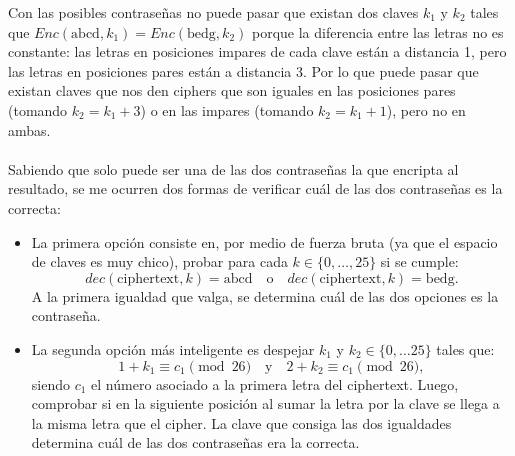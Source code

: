 \documentclass[12pt,addpoints,answers]{exam}
\begin{document}
\begin{questions}
\begin{solution}
    Con las posibles contraseñas no puede pasar que existan dos claves $k_1$ y $k_2$ tales que $Enc(\text{abcd}, k_1) = Enc(\text{bedg}, k_2)$ porque la diferencia entre las letras no es constante: las letras en posiciones impares de cada clave están a distancia 1, pero las letras en posiciones pares están a distancia 3. Por lo que puede pasar que existan claves que nos den ciphers que son iguales en las posiciones pares (tomando $k_2 = k_1 + 3$) o en las impares (tomando $k_2 = k_1 + 1$), pero no en ambas. \\ \\ 
    Sabiendo que solo puede ser una de las dos contraseñas la que encripta al resultado, se me ocurren dos formas de verificar cuál de las dos contraseñas es la correcta:
    \begin{itemize}
        \item La primera opción consiste en, por medio de fuerza bruta (ya que el espacio de claves es muy chico), probar para cada $k \in \{0, \dots , 25\}$ si se cumple:
        \[
            dec(\text{ciphertext}, k) = \text{abcd}
            \quad \text{o} \quad
            dec(\text{ciphertext}, k) = \text{bedg}.
        \]
        A la primera igualdad que valga, se determina cuál de las dos opciones es la contraseña.
        
        \item La segunda opción más inteligente es despejar $k_1$ y $k_2 \in \{ 0, \dots 25 \}$ tales que:
        \[
            1 + k_1 \equiv c_1 \pmod{26}
            \quad \text{y} \quad
            2 + k_2 \equiv c_1 \pmod{26},
        \]
        siendo $c_1$ el número asociado a la primera letra del ciphertext. Luego, comprobar si en la siguiente posición al sumar la letra por la clave se llega a la misma letra que el cipher. La clave que consiga las dos igualdades determina cuál de las dos contraseñas era la correcta.
    \end{itemize}
\end{solution}



\end{questions}
\end{document}
